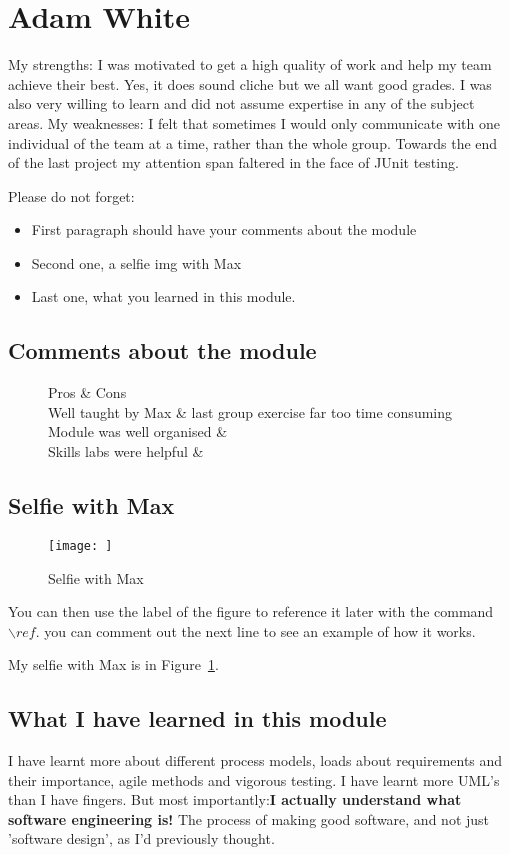 \section{Adam White}
My strengths: I was motivated to get a high quality of work and help my team achieve their best. Yes, it does sound cliche but we all want good grades. I was 
also very willing to learn and did not assume expertise in any of the subject areas.
My weaknesses: I felt that sometimes I would only communicate with one individual of the team at a time, rather than the whole group. Towards the end of the last project my attention span faltered in the face of JUnit testing.

Please do not forget:
\begin{itemize}
	\item First paragraph should have your comments about the module
	\item Second one, a selfie img with Max
	\item Last one, what you learned in this module.
\end{itemize}

\subsection{Comments about the module}
\begin{figure}
	\begin{tabular}[|l | l|]
	Pros & Cons \\ \hline
	Well taught by Max & last group exercise far too time consuming \\ \hline
	Module was well organised & \\ \hline 
	Skills labs were helpful & \\ \hline
	\end{tabular}
\end{figure}

\subsection{Selfie with Max}

\begin{figure}[h]
\caption{Selfie with Max}
\centering
\texttt{[image: ]}
\label{fig:selfie}
\end{figure}

You can then use the label of the figure to reference it later with the command ${\backslash}ref$. you can comment out the next line to see an example of how it works.

My selfie with Max is in  Figure~\ref{fig:selfie}.

\subsection{What I have learned in this module}
I have learnt more about different process models, loads about requirements and their importance, agile methods and vigorous testing. I have learnt more UML's than I have fingers. But most importantly:\textbf{I actually understand what software engineering is!} The process of making good software, and not just 'software design', as I'd previously thought. 
